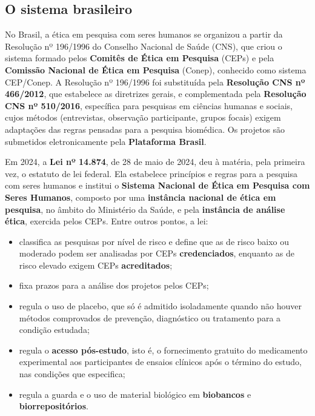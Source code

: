 \documentclass[
]{book}
\providecommand{\tightlist}{%
  \setlength{\itemsep}{0pt}\setlength{\parskip}{0pt}}
\begin{document}
\subsection{O sistema brasileiro}\label{o-sistema-brasileiro}

No Brasil, a ética em pesquisa com seres humanos se organizou a partir da Resolução nº 196/1996 do Conselho Nacional de Saúde (CNS), que criou o sistema formado pelos \textbf{Comitês de Ética em Pesquisa} (CEPs) e pela \textbf{Comissão Nacional de Ética em Pesquisa} (Conep), conhecido como sistema CEP/Conep. A Resolução nº 196/1996 foi substituída pela \textbf{Resolução CNS nº 466/2012}, que estabelece as diretrizes gerais, e complementada pela \textbf{Resolução CNS nº 510/2016}, específica para pesquisas em ciências humanas e sociais, cujos métodos (entrevistas, observação participante, grupos focais) exigem adaptações das regras pensadas para a pesquisa biomédica. Os projetos são submetidos eletronicamente pela \textbf{Plataforma Brasil}.

Em 2024, a \textbf{Lei nº 14.874}, de 28 de maio de 2024, deu à matéria, pela primeira vez, o estatuto de lei federal. Ela estabelece princípios e regras para a pesquisa com seres humanos e institui o \textbf{Sistema Nacional de Ética em Pesquisa com Seres Humanos}, composto por uma \textbf{instância nacional de ética em pesquisa}, no âmbito do Ministério da Saúde, e pela \textbf{instância de análise ética}, exercida pelos CEPs. Entre outros pontos, a lei:

\begin{itemize}
\tightlist
\item
  classifica as pesquisas por nível de risco e define que as de risco baixo ou moderado podem ser analisadas por CEPs \textbf{credenciados}, enquanto as de risco elevado exigem CEPs \textbf{acreditados};
\item
  fixa prazos para a análise dos projetos pelos CEPs;
\item
  regula o uso de placebo, que só é admitido isoladamente quando não houver métodos comprovados de prevenção, diagnóstico ou tratamento para a condição estudada;
\item
  regula o \textbf{acesso pós-estudo}, isto é, o fornecimento gratuito do medicamento experimental aos participantes de ensaios clínicos após o término do estudo, nas condições que especifica;
\item
  regula a guarda e o uso de material biológico em \textbf{biobancos} e \textbf{biorrepositórios}.
\end{itemize}
\end{document}
